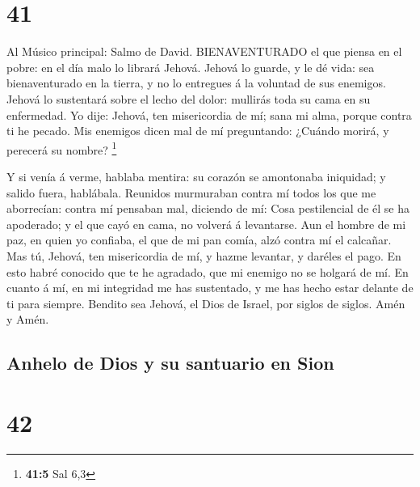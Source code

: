 \hypertarget{section-40}{%
\section{41}\label{section-40}}

 Al Músico principal: Salmo de David. BIENAVENTURADO el que
piensa en el pobre: en el día malo lo librará Jehová. 
Jehová lo guarde, y le dé vida: sea bienaventurado en la tierra, y no lo
entregues á la voluntad de sus enemigos.  Jehová lo
sustentará sobre el lecho del dolor: mullirás toda su cama en su
enfermedad.  Yo dije: Jehová, ten misericordia de mí; sana
mi alma, porque contra ti he pecado.  Mis enemigos dicen mal
de mí preguntando: ¿Cuándo morirá, y perecerá su nombre? \footnote{\textbf{41:5}
  Sal 6,3}

 Y si venía á verme, hablaba mentira: su corazón se
amontonaba iniquidad; y salido fuera, hablábala.  Reunidos
murmuraban contra mí todos los que me aborrecían: contra mí pensaban
mal, diciendo de mí:  Cosa pestilencial de él se ha
apoderado; y el que cayó en cama, no volverá á levantarse. 
Aun el hombre de mi paz, en quien yo confiaba, el que de mi pan comía,
alzó contra mí el calcañar.  Mas tú, Jehová, ten
misericordia de mí, y hazme levantar, y daréles el pago. 
En esto habré conocido que te he agradado, que mi enemigo no se holgará
de mí.  En cuanto á mí, en mi integridad me has sustentado,
y me has hecho estar delante de ti para siempre.  Bendito
sea Jehová, el Dios de Israel, por siglos de siglos. Amén y Amén.

\hypertarget{anhelo-de-dios-y-su-santuario-en-sion}{%
\subsection{Anhelo de Dios y su santuario en
Sion}\label{anhelo-de-dios-y-su-santuario-en-sion}}

\hypertarget{section-41}{%
\section{42}\label{section-41}}

